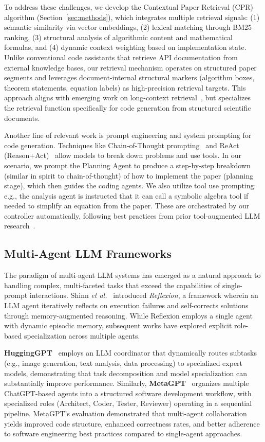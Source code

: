 \documentclass{ieeeaccess}
\begin{document}
To address these challenges, we develop the Contextual Paper Retrieval (CPR) algorithm (Section~\ref{sec:methods}), which integrates multiple retrieval signals: (1) semantic similarity via vector embeddings, (2) lexical matching through BM25 ranking, (3) structural analysis of algorithmic content and mathematical formulas, and (4) dynamic context weighting based on implementation state. Unlike conventional code assistants that retrieve API documentation from external knowledge bases, our retrieval mechanism operates on structured paper segments and leverages document-internal structural markers (algorithm boxes, theorem statements, equation labels) as high-precision retrieval targets. This approach aligns with emerging work on long-context retrieval~\cite{xu2024retrieval}, but specializes the retrieval function specifically for code generation from structured scientific documents.

Another line of relevant work is prompt engineering and system prompting for code generation. Techniques like Chain-of-Thought prompting~\cite{wei2022chain} and ReAct (Reason+Act)~\cite{yao2022react} allow models to break down problems and use tools. In our scenario, we prompt the Planning Agent to produce a step-by-step breakdown (similar in spirit to chain-of-thought) of how to implement the paper (planning stage), which then guides the coding agents. We also utilize tool use prompting: e.g., the analysis agent is instructed that it can call a symbolic algebra tool if needed to simplify an equation from the paper. These are orchestrated by our controller automatically, following best practices from prior tool-augmented LLM research~\cite{qin2023tool}.

\subsection{Multi-Agent LLM Frameworks}
The paradigm of multi-agent LLM systems has emerged as a natural approach to handling complex, multi-faceted tasks that exceed the capabilities of single-prompt interactions. Shinn \emph{et al.}~\cite{shinn2023reflexion} introduced \textit{Reflexion}, a framework wherein an LLM agent iteratively reflects on execution failures and self-corrects solutions through memory-augmented reasoning. While Reflexion employs a single agent with dynamic episodic memory, subsequent works have explored explicit role-based specialization across multiple agents.

\textbf{HuggingGPT}~\cite{shen2023hugginggpt} employs an LLM coordinator that dynamically routes subtasks (e.g., image generation, text analysis, data processing) to specialized expert models, demonstrating that task decomposition and model specialization can substantially improve performance. Similarly, \textbf{MetaGPT}~\cite{hong2024metagpt} organizes multiple ChatGPT-based agents into a structured software development workflow, with specialized roles (Architect, Coder, Tester, Reviewer) operating in a sequential pipeline. MetaGPT's evaluation demonstrated that multi-agent collaboration yields improved code structure, enhanced correctness rates, and better adherence to software engineering best practices compared to single-agent approaches.
\end{document}
